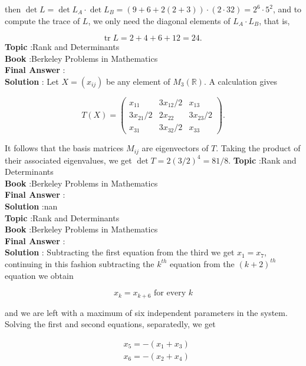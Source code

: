 \documentclass[10pt]{article}
\begin{document}
then $\operatorname{det} L=\operatorname{det} L_{A} \cdot \operatorname{det} L_{B}=(9+6+2(2+3)) \cdot(2 \cdot 32)=2^{6} \cdot 5^{2}$, and to compute the trace of $L$, we only need the diagonal elements of $L_{A} \cdot L_{B}$, that is,

$$
\operatorname{tr} L=2+4+6+12=24 \text {. }
$$
\textbf{Topic} :Rank and Determinants \\
\textbf{Book} :Berkeley Problems in Mathematics\\
\textbf{Final Answer} :\\


\textbf{Solution} : Let $X=\left(x_{i j}\right)$ be any element of $M_{3}(\mathbb{R})$. A calculation gives

$$
T(X)=\left(\begin{array}{ccc}
x_{11} & 3 x_{12} / 2 & x_{13} \\
3 x_{21} / 2 & 2 x_{22} & 3 x_{23} / 2 \\
x_{31} & 3 x_{32} / 2 & x_{33}
\end{array}\right) .
$$

It follows that the basis matrices $M_{i j}$ are eigenvectors of $T$. Taking the product of their associated eigenvalues, we get $\operatorname{det} T=2(3 / 2)^{4}=81 / 8$.
\textbf{Topic} :Rank and Determinants \\
\textbf{Book} :Berkeley Problems in Mathematics\\
\textbf{Final Answer} :\\


\textbf{Solution} :nan\\
\textbf{Topic} :Rank and Determinants \\
\textbf{Book} :Berkeley Problems in Mathematics\\
\textbf{Final Answer} :\\


\textbf{Solution} : Subtracting the first equation from the third we get $x_{1}=x_{7}$, continuing in this fashion subtracting the $k^{t h}$ equation from the $(k+2)^{t h}$ equation we obtain

$$
x_{k}=x_{k+6} \text { for every } k
$$

and we are left with a maximum of six independent parameters in the system. Solving the first and second equations, separatedly, we get

$$
\begin{aligned}
&x_{5}=-\left(x_{1}+x_{3}\right) \\
&x_{6}=-\left(x_{2}+x_{4}\right)
\end{aligned}
$$
\end{document}
